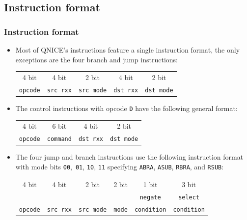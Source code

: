 \documentclass{beamer}
\begin{document}
  \subsection{Instruction format}
   \begin{frame}
    \frametitle{Instruction format}
    \begin{itemize}
     \item Most of QNICE's instructions feature a single instruction 
      format, the only exceptions are the four branch and jump instructions:
      \begin{center}
       \begin{tabular}{|c||c|c||c|c|}
        \hline
         4 bit&4 bit&2 bit&4 bit&2 bit\\
         {\tt opcode}&{\tt src rxx}&{\tt src mode}&
                      {\tt dst rxx}&{\tt dst mode}\\
        \hline
       \end{tabular}
      \end{center}
     \item The control instructions with opcode \texttt{D} have the 
      following general format:
      \begin{center}
       \begin{tabular}{|c||c||c|c|}
        \hline
         4 bit&6 bit&4 bit&2 bit\\
         {\tt opcode}&{\tt command}&{\tt dst rxx}&\texttt{dst mode}\\
        \hline
       \end{tabular}
      \end{center}
     \item The four jump and branch instructions use the following instruction
      format with mode bits \texttt{00}, \texttt{01}, \texttt{10},
      \texttt{11} specifying \texttt{ABRA}, \texttt{ASUB}, \texttt{RBRA}, 
      and \texttt{RSUB}:
      {\scriptsize
       \begin{center}
        \begin{tabular}{|c||c|c||c||c|c|}
         \hline
          4 bit&4 bit&2 bit&2 bit&1 bit&3 bit\\
               &     &     &     &{\tt negate}&{\tt select}\\
          {\tt opcode}&{\tt src rxx}&{\tt src mode}&
                       {\tt mode}&{\tt condition}&{\tt condition}\\
         \hline
        \end{tabular}
       \end{center}
      }
    \end{itemize}
   \end{frame}
%
\end{document}
